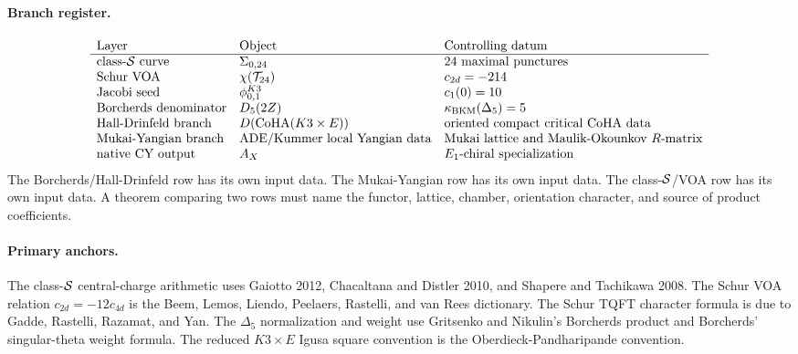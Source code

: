 \paragraph{Branch register.}
\[
\begin{array}{lll}
\text{Layer} & \text{Object} & \text{Controlling datum} \\
\hline
\text{class-\(\mathcal{S}\) curve} & \Sigma_{0,24} & 24\ \text{maximal punctures} \\
\text{Schur VOA} & \chi(\mathcal{T}_{24}) & c_{2d}=-214 \\
\text{Jacobi seed} & \phi_{0,1}^{K3} & c_1(0)=10 \\
\text{Borcherds denominator} & D_5(2Z) & \kappa_{\mathrm{BKM}}(\Delta_5)=5 \\
\text{Hall-Drinfeld branch} & D(\mathrm{CoHA}(K3\times E)) &
  \text{oriented compact critical CoHA data} \\
\text{Mukai-Yangian branch} & \text{ADE/Kummer local Yangian data} &
  \text{Mukai lattice and Maulik-Okounkov \(R\)-matrix} \\
\text{native CY output} & A_X & E_1\text{-chiral specialization}
\end{array}
\]
The Borcherds/Hall-Drinfeld row has its own input data. The
Mukai-Yangian row has its own input data. The class-\(\mathcal{S}\)/VOA row has
its own input data. A theorem comparing two rows must name the functor,
lattice, chamber, orientation character, and source of product
coefficients.

\paragraph{Primary anchors.}
The class-\(\mathcal{S}\) central-charge arithmetic uses Gaiotto 2012,
Chacaltana and Distler 2010, and Shapere and Tachikawa 2008. The
Schur VOA relation \(c_{2d}=-12c_{4d}\) is the Beem, Lemos, Liendo,
Peelaers, Rastelli, and van Rees dictionary. The Schur TQFT character
formula is due to Gadde, Rastelli, Razamat, and Yan. The
\(\Delta_5\) normalization and weight use Gritsenko and Nikulin's
Borcherds product and Borcherds' singular-theta weight formula. The
reduced \(K3\times E\) Igusa square convention is the
Oberdieck-Pandharipande convention.
